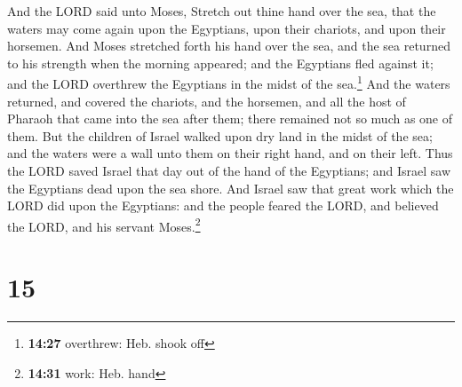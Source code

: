  And the LORD said unto Moses, Stretch out thine hand
over the sea, that the waters may come again upon the Egyptians, upon
their chariots, and upon their horsemen.  And Moses
stretched forth his hand over the sea, and the sea returned to his
strength when the morning appeared; and the Egyptians fled against it;
and the LORD overthrew the Egyptians in the midst of the sea.\footnote{\textbf{14:27}
  overthrew: Heb. shook off}  And the waters returned,
and covered the chariots, and the horsemen, and all the host of Pharaoh
that came into the sea after them; there remained not so much as one of
them.  But the children of Israel walked upon dry land in
the midst of the sea; and the waters were a wall unto them on their
right hand, and on their left.  Thus the LORD saved
Israel that day out of the hand of the Egyptians; and Israel saw the
Egyptians dead upon the sea shore.  And Israel saw that
great work which the LORD did upon the Egyptians: and the people feared
the LORD, and believed the LORD, and his servant Moses.\footnote{\textbf{14:31}
  work: Heb. hand}

\hypertarget{section-14}{%
\section{15}\label{section-14}}

